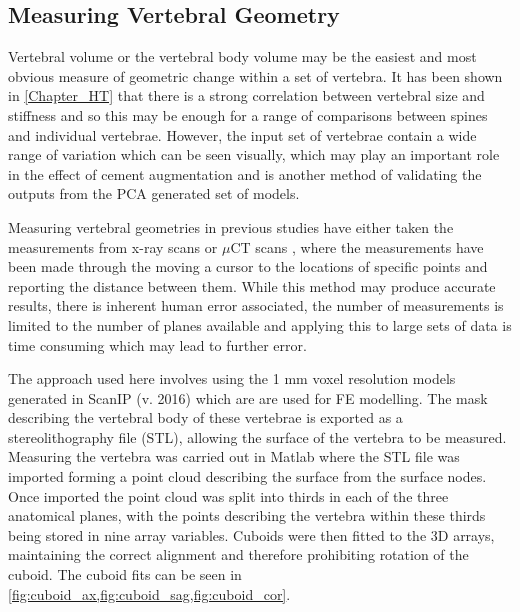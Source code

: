 \subsection{Measuring Vertebral Geometry}

Vertebral volume or the vertebral body volume may be the easiest and most
obvious measure of geometric change within a set of vertebra.  It has been
shown in \cref{Chapter_HT} that there is a strong correlation between vertebral
size and stiffness and so this may be enough for a range of comparisons between
spines and individual vertebrae.  However, the input set of vertebrae contain a
wide range of variation which can be seen visually, which may play an important
role in the effect of cement augmentation and is another method of validating
the outputs from the PCA generated set of models.

Measuring vertebral geometries in previous studies have either taken the
measurements from x-ray scans \cite{Gilad1986,Gilad1985} or $\mu$CT scans
\cite{Zhou2000,Cheung1994}, where the measurements have been made through the
moving a cursor to the locations of specific points and reporting the distance
between them.  While this method may produce accurate results, there is
inherent human error associated, the number of measurements is limited to the
number of planes available and applying this to large sets of data is time
consuming which may lead to further error.

The approach used here involves using the 1 mm voxel resolution models
generated in ScanIP (v. 2016) which are are used for FE modelling.  The mask
describing the vertebral body of these vertebrae is exported as a
stereolithography file (STL), allowing the surface of the vertebra to be
measured.  Measuring the vertebra was carried out in Matlab where the STL file
was imported forming a point cloud describing the surface from the surface
nodes.  Once imported the point cloud was split into thirds in each of the
three anatomical planes, with the points describing the vertebra within these
thirds being stored in nine array variables.  Cuboids were then fitted to the
3D arrays, maintaining the correct alignment and therefore prohibiting rotation
of the cuboid.  The cuboid fits can be seen in
\cref{fig:cuboid_ax,fig:cuboid_sag,fig:cuboid_cor}.



